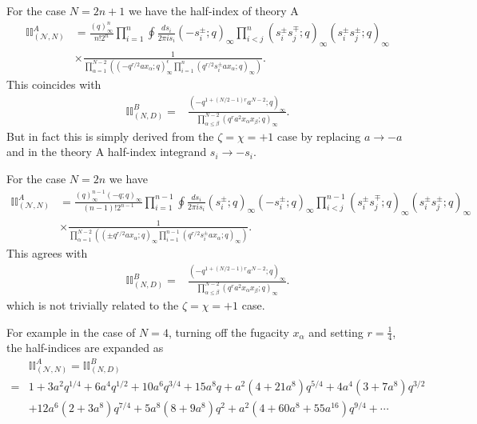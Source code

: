 \documentclass[12pt]{article}
\numberwithin{equation}{section}
\begin{document}
For the case $N = 2n+1$ we have the half-index of theory A
\begin{align}
\mathbb{II}_{(\mathcal{N},N)}^A
&=
\frac{(q)_{\infty}^n}{n! 2^n} \prod_{i=1}^n \oint \frac{ds_i}{2\pi i s_i}
(-s_i^{\pm}; q)_{\infty}
\prod_{i < j}^n (s_i^{\pm} s_j^{\mp}; q)_{\infty} (s_i^{\pm} s_j^{\pm}; q)_{\infty}
 \nonumber \\
& \times
\frac{1}{\prod_{\alpha = 1}^{N - 2} \left( (-q^{r/2} a x_{\alpha}; q)_{\infty}^{\epsilon} \prod_{i = 1}^n (q^{r/2} s_i^{\pm} a x_{\alpha}; q)_{\infty} \right)}. 
\end{align}
This coincides with 
\begin{align}
\mathbb{II}_{(N,D)}^B = & \frac{\left( -q^{1 + (N/2 - 1)r} a^{N-2}; q \right)_{\infty}}{\prod_{\alpha \le \beta}^{N-2} (q^r a^2 x_{\alpha} x_{\beta}; q)_{\infty}}. 
\end{align}
But in fact this is simply derived from the $\zeta = \chi = +1$ case by replacing $a \rightarrow -a$ and in the theory A half-index integrand $s_i \rightarrow -s_i$.

For the case $N = 2n$ we have
\begin{align}
\mathbb{II}_{(\mathcal{N},N)}^A
&=
\frac{(q)_{\infty}^{n-1} (-q; q)_{\infty}}{(n-1)! 2^{n-1}} \prod_{i=1}^{n-1} \oint \frac{ds_i}{2\pi i s_i}
(s_i^{\pm}; q)_{\infty} (-s_i^{\pm}; q)_{\infty}
\prod_{i < j}^{n-1} (s_i^{\pm} s_j^{\mp}; q)_{\infty} (s_i^{\pm} s_j^{\pm}; q)_{\infty}
 \nonumber \\
 &\times
\frac{1}{\prod_{\alpha = 1}^{N - 2} \left( (\pm q^{r/2} a x_{\alpha}; q)_{\infty} \prod_{i = 1}^{n-1} (q^{r/2} s_i^{\pm} a x_{\alpha}; q)_{\infty} \right)}. 
\end{align}
This agrees with 
\begin{align}
\mathbb{II}_{(N,D)}^B = & \frac{\left( -q^{1 + (N/2 - 1)r} a^{N-2}; q \right)_{\infty}}{\prod_{\alpha \le \beta}^{N-2} (q^r a^2 x_{\alpha} x_{\beta}; q)_{\infty}}. 
\end{align}
which is not trivially related to the $\zeta = \chi = +1$ case.

For example in the case of $N = 4$, turning off the fugacity $x_{\alpha}$ and setting $r=\frac14$, 
the half-indices are expanded as 
\begin{align}
& \mathbb{II}_{(\mathcal{N},N)}^A
 = \mathbb{II}_{(N,D)}^B
\nonumber\\
 = &   1 + 3 a^2 q^{1/4} + 6 a^4 q^{1/2} + 10 a^6 q^{3/4} + 15 a^8 q + 
 a^2 (4 + 21 a^8) q^{5/4} + 4 a^4 (3 + 7 a^8) q^{3/2}
 \nonumber \\
 & + 
 12 a^6 (2 + 3 a^8) q^{7/4} + 5 a^8 (8 + 9 a^8) q^2 + 
 a^2 (4 + 60 a^8 + 55 a^16) q^{9/4}
 + \cdots
\end{align}
\end{document}
